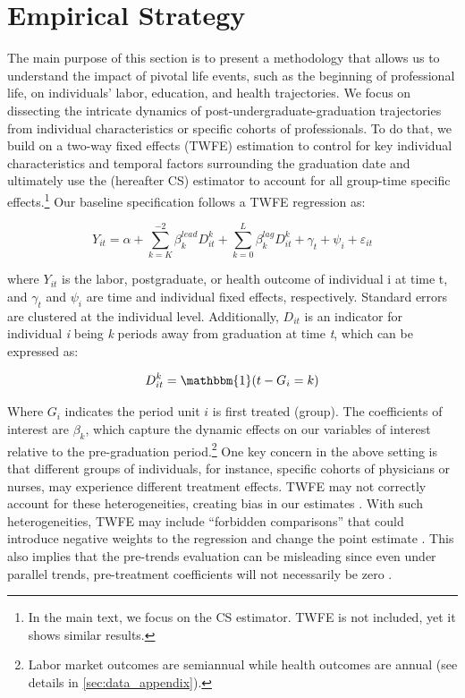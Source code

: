 \documentclass[12pt, a4paper]{article}
\begin{document}
\section{Empirical Strategy} \label{sec:empirical}

The main purpose of this section is to present a methodology that allows us to understand the impact of pivotal life events, such as the beginning of professional life, on individuals' labor, education, and health trajectories. We focus on dissecting the intricate dynamics of post-undergraduate-graduation trajectories from individual characteristics or specific cohorts of professionals. To do that, we build on a two-way fixed effects (TWFE) estimation to control for key individual characteristics and temporal factors surrounding the graduation date and ultimately use the \citet{callaway2021difference} (hereafter CS) estimator to account for all group-time specific effects.\footnote{In the main text, we focus on the CS estimator. TWFE is not included, yet it shows similar results.} Our baseline specification follows a TWFE regression as:

\begin{equation}
        Y_{it} = \alpha + \sum_{k=K}^{-2} \beta_k^{lead} D_{it}^{k} + \sum_{k=0}^{L} \beta_k^{lag} D_{it}^{k} + \gamma_t + \psi_i + \varepsilon_{it}
\end{equation}

\noindent where $Y_{it}$ is the labor, postgraduate, or health outcome of individual i at time t, and $\gamma_t$ and $\psi_i$ are time and individual fixed effects, respectively. Standard errors are clustered at the individual level. Additionally, $D_{it}$ is an indicator for individual \textit{i} being \textit{k} periods away from graduation at time \textit{t}, which can be expressed as:

\begin{equation} 
D_{it}^{k} = \mathbbm{1}(t - G_i = k) 
\end{equation}

Where $G_i$ indicates the period unit $i$ is first treated (group). The coefficients of interest are $\beta_k$, which capture the dynamic effects on our variables of interest relative to the pre-graduation period.\footnote{Labor market outcomes are semiannual while health outcomes are annual (see details in \autoref{sec:data_appendix}).} One key concern in the above setting is that different groups of individuals, for instance, specific cohorts of physicians or nurses, may experience different treatment effects. TWFE may not correctly account for these heterogeneities, creating bias in our estimates \citep{de2020two,roth2023whats}. With such heterogeneities, TWFE may include ``forbidden comparisons'' that could introduce negative weights to the regression and change the point estimate \citep{goodman2021difference}. This also implies that the pre-trends evaluation can be misleading since even under parallel trends, pre-treatment coefficients will not necessarily be zero \citep{sun2020csdid,roth2023whats}. 
\end{document}
